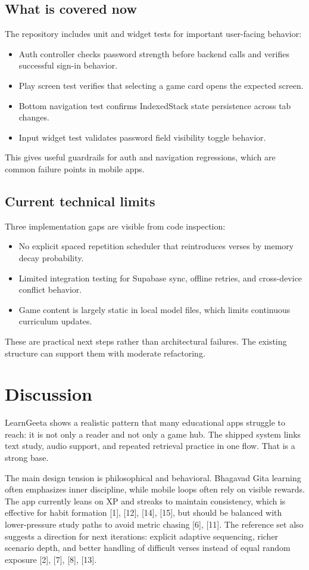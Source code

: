 \documentclass[conference]{IEEEtran}
\begin{document}
\subsection{What is covered now}
The repository includes unit and widget tests for important user-facing behavior:
\begin{itemize}
\item Auth controller checks password strength before backend calls and verifies successful sign-in behavior.
\item Play screen test verifies that selecting a game card opens the expected screen.
\item Bottom navigation test confirms IndexedStack state persistence across tab changes.
\item Input widget test validates password field visibility toggle behavior.
\end{itemize}

This gives useful guardrails for auth and navigation regressions, which are common failure points in mobile apps.

\subsection{Current technical limits}
Three implementation gaps are visible from code inspection:
\begin{itemize}
\item No explicit spaced repetition scheduler that reintroduces verses by memory decay probability.
\item Limited integration testing for Supabase sync, offline retries, and cross-device conflict behavior.
\item Game content is largely static in local model files, which limits continuous curriculum updates.
\end{itemize}

These are practical next steps rather than architectural failures. The existing structure can support them with moderate refactoring.

\section{Discussion}
LearnGeeta shows a realistic pattern that many educational apps struggle to reach: it is not only a reader and not only a game hub. The shipped system links text study, audio support, and repeated retrieval practice in one flow. That is a strong base.

The main design tension is philosophical and behavioral. Bhagavad Gita learning often emphasizes inner discipline, while mobile loops often rely on visible rewards. The app currently leans on XP and streaks to maintain consistency, which is effective for habit formation [1], [12], [14], [15], but should be balanced with lower-pressure study paths to avoid metric chasing [6], [11]. The reference set also suggests a direction for next iterations: explicit adaptive sequencing, richer scenario depth, and better handling of difficult verses instead of equal random exposure [2], [7], [8], [13].
\end{document}
